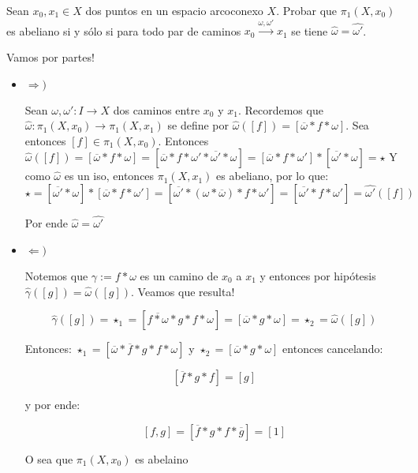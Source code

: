 \documentclass[11pt]{article}
\newenvironment{proof}[1][Demostraci\'on]{\begin{trivlist}
\item[\hskip \labelsep {\bfseries #1}]}{\end{trivlist}}
\begin{document}
\begin{enumerate}
\begin{proof}
\end{proof}

\item Sean $x_0,x_1 \in X$ dos puntos en un espacio arcoconexo $X$. Probar que $\pi_1(X,x_0)$ es abeliano si y s\'olo si para todo par de caminos  $x_0 \xrightarrow{\omega,\omega'}x_1$ se tiene $\widehat \omega=\widehat{\omega'}$.  

\begin{proof}
Vamos por partes!
\begin{itemize}

\item {$\Longrightarrow)$}

Sean $\omega, \omega' :I \rightarrow X$ dos caminos entre $x_0$ y $x_1$. Recordemos que $\hat{\omega}:\pi_1(X,x_0) \rightarrow \pi_1(X,x_1)$ se define por $\hat{\omega}([f])=[\overline{\omega}*f*{\omega}]$. Sea entonces $[f] \in \pi_1(X,x_0)$. Entonces $\hat{\omega}([f])=[\overline{\omega}*f*{\omega}]=[\overline{\omega}*f*\omega'*\overline{\omega'}*{\omega}]=[\overline{\omega}*f*\omega']*[\overline{\omega'}*{\omega}]=\star$
Y como $\hat{\omega}$ es un iso, entonces $\pi_1(X,x_1)$ es abeliano, por lo que:
$\star=[\overline{\omega'}*{\omega}]*[\overline{\omega}*f*\omega']=[\overline{\omega'}*({\omega}*\overline{\omega})*f*\omega']=[\overline{\omega'}*f*\omega']=\hat{\omega'}([f])$

Por ende $\hat{\omega}=\hat{\omega'}$

\item {$\Longleftarrow)$}

Notemos que $\gamma := f*\omega$ es un camino de $x_0$ a $x_1$ y entonces por hip\'otesis $\hat{\gamma}([g])=\hat{\omega}([g])$. Veamos que resulta!

$$\hat{\gamma}([g]) = \star_1 = [\overline{f*\omega}*g*f*\omega]=[\overline{\omega}*g*\omega]= \star_2 = \hat{\omega}([g])$$

Entonces: $\star_1 = [\overline{\omega}*\overline{f}*g*f*\omega]$ y $\star_2 = [\overline{\omega}*g*\omega]$ entonces cancelando:

$$[\overline{f}*g*f]=[g]$$

y por ende:

$$[f,g]=[\overline{f}*g*f*\overline{g}]=[1]$$

O sea que $\pi_1(X,x_0)$ es abelaino 

\end{itemize}

\end{proof}


\end{enumerate}
\end{document}
